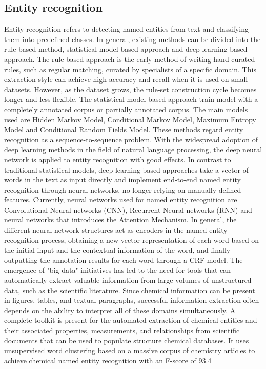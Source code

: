 \documentclass[%
 aip,
 jmp,%
 amsmath,amssymb,
 reprint,%
]{revtex4-2}
\begin{document}
\subsection{Entity recognition}
Entity recognition refers to detecting named entities from text and classifying them into predefined classes.
In general, existing methods can be divided into the rule-based method, statistical model-based approach and 
deep learning-based approach.
The rule-based approach is the early method of writing hand-curated rules, such as regular matching, curated 
by specialists of a specific domain. This extraction style can achieve
high accuracy and recall when it is used on small datasets. However, as the dataset grows, 
the rule-set construction cycle becomes longer and less flexible.
The statistical model-based approach train model with a completely annotated corpus or partially annotated corpus.
The main models used are Hidden Markov Model, Conditional Markov Model, Maximum Entropy Model and Conditional Random
Fields Model. These methods regard entity recognition as a sequence-to-sequence problem.
With the widespread adoption of deep learning methods in the field 
of natural language processing, the deep neural network is applied to 
entity recognition with good effects. In contrast to traditional 
statistical models, deep learning-based approaches take a vector of words in the text as input directly and implement end-to-end named entity recognition through neural networks, no longer relying on manually defined features.
Currently, neural networks used for named entity
recognition are Convolutional Neural networks (CNN), 
Recurrent Neural networks (RNN) and neural networks 
that introduces the Attention Mechanism. In general, the different
neural network structures act as encoders in the named entity 
recognition process, obtaining a new vector representation 
of each word based on the initial input and the contextual 
information of the word, and finally outputting the annotation 
results for each word through a CRF model.
The emergence of "big data" initiatives has led to the need for tools that 
can automatically extract valuable information from large volumes of unstructured
data, such as the scientific literature. Since chemical information can be present
in figures, tables, and textual paragraphs, successful information extraction often
depends on the ability to interpret all of these domains simultaneously. A complete
toolkit is present for the automated extraction of chemical entities and their associated
properties, measurements, and relationships from scientific documents that can be used
to populate structure chemical databases. It uses unsupervised word clustering based on
a massive corpus of chemistry  articles to achieve chemical named entity recognition with an 
F-score of 93.4%
\end{document}

